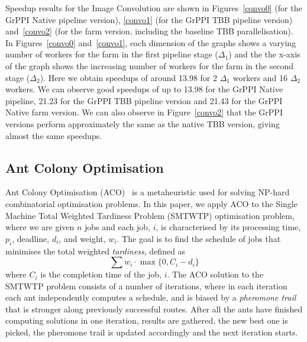 Speedup results for the Image Convolution are shown in Figures~\ref{convo0} (for the GrPPI Native pipeline version), \ref{convo1} (for the GrPPI TBB pipeline version) and~\ref{convo2} (for the farm version, including the baseline TBB parallelisation). In Figures~\ref{convo0} and~\ref{convo1}, each dimension of the graphs shows a varying number of workers for the farm in the first pipeline stage ($\Delta_{1}$) and the the x-axis of the graph shows the increasing number of workers for the farm in the second stage ($\Delta_{2}$). Here we obtain speedups of around 13.98 for 2 $\Delta_{1}$ workers and 16 $\Delta_{2}$ workers. We can observe good speedups of up to 13.98 for the GrPPI Native pipeline, 21.23 for the GrPPI TBB pipeline version and 21.43 for the GrPPI Native farm version. We can also observe in Figure~\ref{convo2} that the GrPPI versions perform approximately the same as the native TBB version, giving almost the same speedups. 

\subsection{Ant Colony Optimisation}

Ant Colony Optimisation (ACO)~\cite{Dorigo-aco-book} is a metaheuristic used for solving NP-hard combinatorial optimisation problems. In this paper, we apply ACO to the  Single Machine Total Weighted Tardiness Problem (SMTWTP) optimisation problem, where we are given $n$ jobs and each job, $i$, is characterised by its processing time, $p_i$, deadline, $d_i$,  and weight, $w_i$. The goal is to find the schedule of jobs that minimises the total weighted \emph{tardiness}, defined as $$\sum w_i \cdot \max \{0, C_i-d_i\}$$ where $C_i$ is the completion time of the job, $i$. The ACO solution to the SMTWTP problem consists of a number of iterations, where in each iteration each ant
independently computes a schedule, and is biased by a \emph{pheromone trail} that is stronger along previously successful routes. After all the ants have finished computing solutions in one iteration, results are gathered, the new best one is picked, the pheromone trail is updated accordingly and the next iteration starts.

